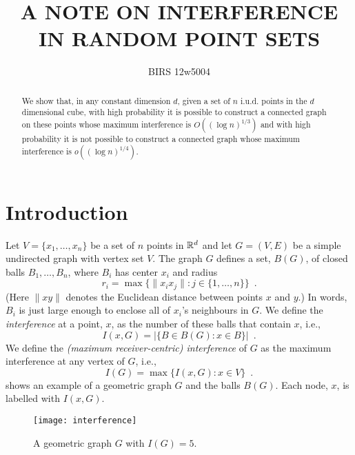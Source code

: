 \documentclass{patmorin}
\title{\MakeTextUppercase{A Note on Interference in Random Point Sets}}
\author{BIRS 12w5004}
\begin{document}
\maketitle

\begin{abstract}
  We show that, in any constant dimension $d$, given a set of $n$
  i.u.d. points in the $d$ dimensional cube, with high probability it is
  possible to construct a connected graph on these points whose maximum
  interference is $O((\log n)^{1/3})$ and with high probability it is
  not possible to construct a connected graph whose maximum interference
  is $o((\log n)^{1/4})$.
\end{abstract}

\section{Introduction}


Let $V=\{x_1,\ldots,x_n\}$ be a set of $n$ points in $\mathbb{R}^d$ and let
$G=(V,E)$ be a simple undirected graph with vertex set $V$.  The graph
$G$ defines a set, $B(G)$, of closed balls $B_1,\ldots,B_n$, where $B_i$
has center $x_i$ and radius
\[
   r_i = \max\{\|x_ix_j\| : j\in\{1,\ldots,n\}\} \enspace .
\]
(Here $\|xy\|$ denotes the Euclidean distance between points $x$ and $y$.)
In words, $B_i$ is just large enough to enclose all of $x_i$'s neighbours
in $G$.  We define the \emph{interference} at a point, $x$, as the number
of these balls that contain $x$, i.e.,
\[
    I(x,G) = |\{B\in B(G) : x\in B\}| \enspace .
\]
We define the \emph{(maximum receiver-centric) interference} of $G$ as the
maximum interference at any vertex of $G$, i.e.,
\[
   I(G) = \max\{I(x,G) : x\in V\} \enspace .
\]
 shows an example of a geometric graph $G$ and the
balls $B(G)$.  Each node, $x$, is labelled with $I(x,G)$.
\begin{figure}
  \begin{center}
    \texttt{[image: interference]}
  \end{center}
  \caption{A geometric graph $G$ with $I(G)=5$.}
\end{figure}
\end{document}
